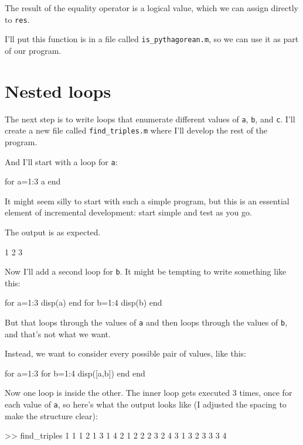 The result of the equality operator is a logical value, which we can assign directly 
to {\tt res}.

I'll put this function is in a file called \verb"is_pythagorean.m", so we can use it as part of our program.


\section{Nested loops}

The next step is to write loops that enumerate different values of {\tt a}, {\tt b}, and 
{\tt c}.  I'll create a new file called \verb"find_triples.m" where I'll develop the rest of the program.


And I'll start with a loop for {\tt a}:

\begin{code}
for a=1:3
    a
end
\end{code}

It might seem silly to start with such a simple program, but this is an essential element of incremental development: start simple and test as you go.

The output is as expected.

\begin{code}
1
2
3
\end{code}

Now I'll add a second loop for {\tt b}.  It might be tempting to write something like this:

\begin{code}
for a=1:3
    disp(a)
end
for b=1:4
    disp(b)
end
\end{code}

But that loops through the values of {\tt a} and then loops through the values of {\tt b}, and that's not what we want.

Instead, we want to consider every possible pair of values, like this:

\begin{code}
for a=1:3
    for b=1:4
        disp([a,b])
    end
end
\end{code}

Now one loop is inside the other.  The inner loop gets executed 3 times, once for each value of {\tt a}, so here's what the output looks like (I adjusted the spacing to make
the structure clear):

\begin{code}
>> find_triples
     1     1
     1     2
     1     3
     1     4
     2     1
     2     2
     2     3
     2     4
     3     1
     3     2
     3     3
     3     4
\end{code}

